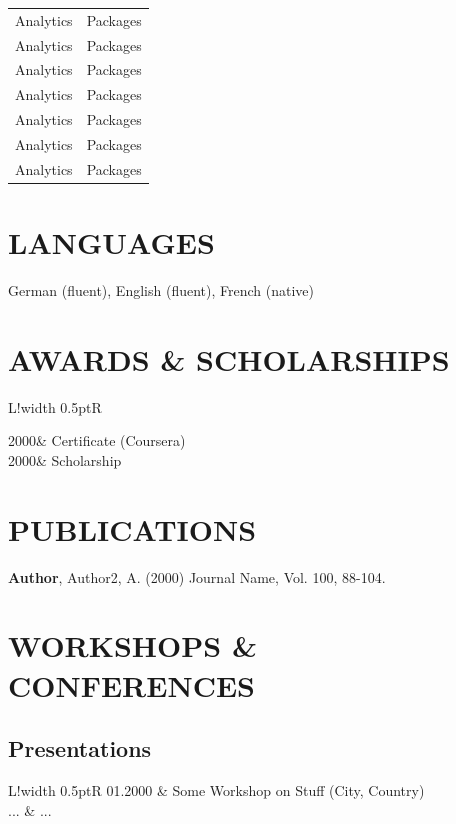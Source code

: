 \documentclass[10pt,a4paper]{article}
\newcommand\VRule{\color{lightgray}\vrule width 0.5pt} %
\begin{document}
\begin{tabular}{p{3cm}|p{12cm}}
Analytics & Packages \\
Analytics & Packages \\
Analytics & Packages \\
Analytics & Packages \\
Analytics & Packages \\
Analytics & Packages \\
Analytics & Packages \\

\end{tabular} 

\section*{\textbf{LANGUAGES}}

German (fluent), English (fluent), French (native) \\

\section*{\textbf{AWARDS \& SCHOLARSHIPS}}
\begin{tabular}{L!{\VRule}R}

2000&
Certificate (Coursera)
\vspace{2pt}\\

2000&
Scholarship\vspace{2pt}\\

\end{tabular}

\section*{\textbf{PUBLICATIONS}}

\textbf{Author}, Author2, A. (2000) Journal Name, Vol. 100, 88-104.\\

\section*{\textbf{WORKSHOPS \& CONFERENCES}}

\subsection*{Presentations}
\begin{tabular}{L!{\VRule}R}
01.2000 & Some Workshop on Stuff (City, Country)\\
... & ...\\
\end{tabular}
\end{document}
